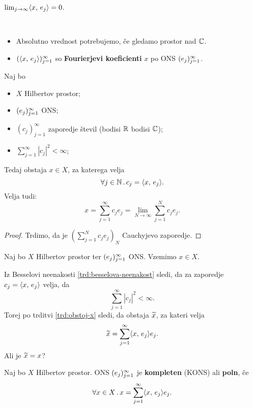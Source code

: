 \begin{posledica}
    \(\lim_{j \to \infty} \langle x, \, e_j \rangle = 0\).
\end{posledica}

\begin{opomba} \
    \begin{itemize}
        \item Absolutno vrednost potrebujemo, če gledamo prostor nad \(\mathbb{C}\).
        \item \((\langle x, \, e_j \rangle)_{j = 1}^\infty\) so \textbf{Fourierjevi koeficienti} \(x\) po ONS \((e_j)_{j=1}^\infty\).
    \end{itemize}
\end{opomba}

\begin{trditev}
    \label{trd:obstoj-x}
    Naj bo 
    \begin{itemize}
        \item \(X\) Hilbertov prostor;
        \item \((e_j)_{j=1}^\infty\) ONS;
        \item \((c_j)_{j=1}^\infty\) zaporedje števil (bodisi \(\mathbb{R}\) bodisi \(\mathbb{C}\));
        \item \(\sum_{j=1}^{\infty} |c_j|^2 < \infty\);
    \end{itemize}
    Tedaj obstaja \(x \in X\), za katerega velja 
    \[\forall j \in \mathbb{N} \,.\, c_j = \langle x, \, e_j \rangle.\]
    Velja tudi:
    \[x = \sum_{j = 1}^{\infty}c_je_j = \lim_{N \to \infty} \sum_{j=1}^{N}c_je_j.\]
\end{trditev}

\begin{proof}
    Trdimo, da je \(\left(\sum_{j=1}^{N}c_je_j\right)_N\) Cauchyjevo zaporedje.
\end{proof}

\begin{opomba}
    Naj bo \(X\) Hilbertov prostor ter \((e_j)_{j=1}^\infty\) ONS. Vzemimo \(x \in X\). 
    
    Iz Besselovi neenakosti \ref{trd:besselova-neenakost} sledi, da za zaporedje \(c_j = \langle x, \, e_j \rangle\) velja, da 
    \[\sum_{j=1}^{\infty} |c_j|^2 < \infty.\]
    Torej po trditvi \ref{trd:obstoj-x} sledi, da obstaja \(\widetilde{x}\), za kateri velja
    \[
    \widetilde{x} = \sum_{j=1}^{\infty} \langle x, \, e_j \rangle e_j.
    \]
    Ali je \(\widetilde{x} = x\)?
\end{opomba}

\begin{definicija}
    Naj bo \(X\) Hilbertov prostor. ONS \((e_j)_{j=1}^\infty\) je \textbf{kompleten} (KONS) ali \textbf{poln}, če 
    \[\forall x \in X \,.\, x = \sum_{j=1}^{\infty} \langle x, \, e_j \rangle e_j.\]
\end{definicija}

